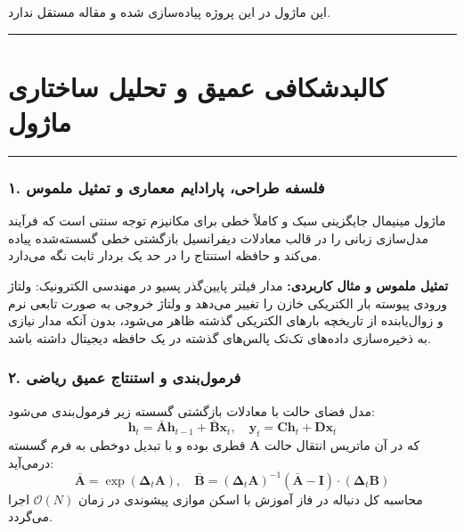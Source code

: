 \clearpage
{}
\vspace*{0.2cm}

این ماژول در این پروژه پیاده‌سازی شده و مقاله مستقل ندارد.
\noindent\rule{\textwidth}{1.2pt}
\vspace*{0.1cm}
\section{کالبدشکافی عمیق و تحلیل ساختاری ماژول }
\label{sec:mod_simple_ssm}
\vspace*{-0.2cm}
\noindent\rule{\textwidth}{0.5pt}
\vspace*{0.3cm}

\subsubsection*{۱. فلسفه طراحی، پارادایم معماری و تمثیل ملموس}
ماژول مینیمال  جایگزینی سبک و کاملاً خطی برای مکانیزم توجه سنتی است که فرآیند مدل‌سازی زبانی را در قالب معادلات دیفرانسیل بازگشتی خطی گسسته‌شده پیاده می‌کند و حافظه استنتاج را در حد یک بردار ثابت نگه می‌دارد.

\textbf{تمثیل ملموس و مثال کاربردی:}
مدار فیلتر پایین‌گذر پسیو  در مهندسی الکترونیک: ولتاژ ورودی پیوسته بار الکتریکی خازن را تغییر می‌دهد و ولتاژ خروجی به صورت تابعی نرم و زوال‌یابنده از تاریخچه بارهای الکتریکی گذشته ظاهر می‌شود، بدون آنکه مدار نیازی به ذخیره‌سازی داده‌های تک‌تک پالس‌های گذشته در یک حافظه دیجیتال داشته باشد.

\subsubsection*{۲. فرمول‌بندی و استنتاج عمیق ریاضی }
مدل فضای حالت با معادلات بازگشتی گسسته زیر فرمول‌بندی می‌شود:
\begin{equation}
\mathbf{h}_t = \bar{\mathbf{A}} \mathbf{h}_{t-1} + \bar{\mathbf{B}} \mathbf{x}_t, \quad \mathbf{y}_t = \mathbf{C} \mathbf{h}_t + \mathbf{D} \mathbf{x}_t
\end{equation}
که در آن ماتریس انتقال حالت $\mathbf{A}$ قطری بوده و با تبدیل دوخطی  به فرم گسسته درمی‌آید:
\begin{equation}
\bar{\mathbf{A}} = \exp(\boldsymbol{\Delta}_t \mathbf{A}), \quad \bar{\mathbf{B}} = (\boldsymbol{\Delta}_t \mathbf{A})^{-1} (\bar{\mathbf{A}} - \mathbf{I}) \cdot (\boldsymbol{\Delta}_t \mathbf{B})
\end{equation}
محاسبه کل دنباله در فاز آموزش با اسکن موازی پیشوندی  در زمان $\mathcal{O}(N)$ اجرا می‌گردد.

